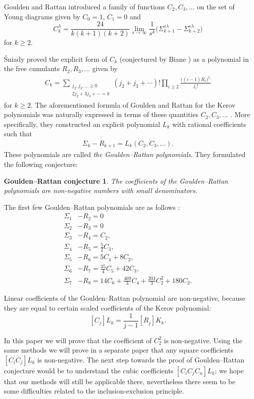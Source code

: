 \documentclass[submission]{FPSAC2021}
\newtheorem*{conjecture}{Goulden--Rattan conjecture}
\begin{document}
Goulden and Rattan \cite{GR05} introduced 
a family of functions $C_2,C_3,\dots$ on 
the set of Young diagrams given by
$C_0=1$, $C_1=0$ and
$$C_k^{\lambda}=\frac{24}{k(k+1)(k+2)}\lim_{s\to\infty}\frac{1}{s^k}\big(\Sigma_{k+1}^{s\lambda}-\Sigma_{k+2}^{s\lambda}\big)$$
for $k\geq2$.

Śniady \cite{Sni06} proved the explicit form of $C_k$
(conjectured by Biane \cite{Bia03}) as a polynomial in the 
free cumulants $R_2, R_3, \ldots$ given by
\begin{align}
\label{cformula}
C_k=\sum_{\substack{j_2,j_3,\ldots \geq 0 \\ 2j_2+3j_3+\cdots=k}}
(j_2+j_3+\cdots)!\prod_{i\geq 2} \frac{\big( (i-1)R_i\big)^{j_i}}{j_i!}
\end{align}
for $k\geq 2$.
The aforementioned formula of Goulden and Rattan for 
the Kerov polynomials was naturally expressed in 
terms of these quantities $C_2,C_3,\dots$ \cite{GR05}. 
More specifically, they constructed an explicit 
polynomial $L_k$ with rational coefficients such that 
\begin{align}
\label{grpol}
\Sigma_k-R_{k+1}=L_k(C_2, C_3, \ldots).
\end{align}
These polynomials are called 
\emph{the Goulden--Rattan polynomials}. 
They formulated the following conjecture:
\begin{conjecture}
\label{hipotezaGR}
The coefficients of the Goulden--Rattan polynomials 
are non-negative numbers with small denominators. 
\end{conjecture}
The first few Goulden--Rattan polynomials are 
as follows \cite{GR05}:
\begin{align*}
\Sigma_1&-R_2=0\\
\Sigma_2&-R_3=0\\
\Sigma_3&-R_4=C_2,\\
\Sigma_4&-R_5=\frac{5}{2}C_3,\\
\Sigma_5&-R_6=5C_4+8C_2,\\
\Sigma_6&-R_7=\frac{35}{4}C_5+42C_3,\\
\Sigma_7&-R_8=14C_6+\frac{469}{3}C_4+\frac{203}{3}C_2^2+180C_2.
\end{align*}

Linear coefficients of the Goulden--Rattan polynomial 
are non-negative, because they are equal to certain 
scaled coefficients of the Kerov polynomial:
\[ [ C_j ] L_k=\frac{1}{j-1} [ R_j ] K_k. \]

In this paper we will prove that the coefficient 
of $C_2^2$ is non-negative. Using the same methods 
we will prove in a separate paper \cite{Mar21} that 
any square coefficients $[ C_i C_j ] L_k$ is 
non-negative. The next step towards the proof of 
Goulden--Rattan conjecture would be to understand 
the cubic coefficients $ [ C_i C_j C_u ] L_k$; we 
hope that our methods will still be applicable there,
nevertheless there seem to be some difficulties 
related to the inclusion-exclusion principle.
\end{document}
